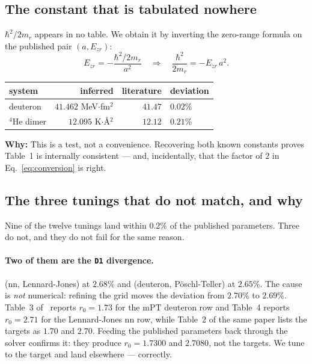\documentclass[11pt,a4paper]{article}
\newcommand{\why}[1]{\medskip\noindent\textbf{Why:} #1\medskip}
\begin{document}
\subsection{The constant that is tabulated nowhere}

$\hbar^2/2m_r$ appears in no table. We obtain it by inverting the zero-range
formula on the published pair $(a, E_{zr})$:
\begin{equation}
  E_{zr} = -\frac{\hbar^2/2m_r}{a^2}
  \quad\Longrightarrow\quad
  \frac{\hbar^2}{2m_r} = -E_{zr}\,a^2 .
\end{equation}

\begin{center}
\begin{tabular}{lrrl}
\toprule
system & inferred & literature & deviation \\
\midrule
deuteron & $41.462$ MeV$\cdot$fm$^2$ & $41.47$ & $0.02\%$ \\
$^4$He dimer & $12.095$ K$\cdot$\AA$^2$ & $12.12$ & $0.21\%$ \\
\bottomrule
\end{tabular}
\end{center}

\why{This is a test, not a convenience. Recovering both known constants
proves Table~1 is internally consistent --- and, incidentally, that the factor
of 2 in Eq.~\eqref{eq:conversion} is right.}

\subsection*{The three tunings that do not match, and why}
\label{sec:flat}

Nine of the twelve tunings land within $0.2\%$ of the published parameters.
Three do not, and they do not fail for the same reason.

\paragraph{Two of them are the \texttt{D1} divergence.}
(nn, Lennard-Jones) at $2.68\%$ and (deuteron, Pöschl-Teller) at $2.65\%$. The
cause is \emph{not} numerical: refining the grid moves the deviation from
$2.70\%$ to $2.69\%$. Table~3 of~\cite{rbef} reports $r_0 = 1.73$ for the mPT
deuteron row and Table~4 reports $r_0 = 2.71$ for the Lennard-Jones nn row,
while Table~2 of the same paper lists the targets as $1.70$ and $2.70$.
Feeding the published parameters back through the solver confirms it: they
produce $r_0 = 1.7300$ and $2.7080$, not the targets. We tune to the target and
land elsewhere --- correctly.
\end{document}
